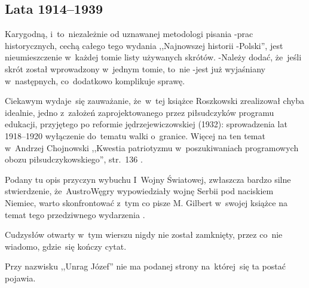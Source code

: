 \documentclass[a4paper,11pt]{article}
\begin{document}
\subsection{Lata 1914--1939}

\vspace{\spaceThree}






\start Karygodną, i~to~niezależnie od uznawanej metodologi pisania
-prac historycznych, cechą całego tego wydania ,,Najnowszej historii
-Polski'', jest nieumieszczenie w~każdej tomie listy używanych
skrótów. -Należy dodać, że~jeśli skrót został wprowadzony w~jednym
tomie, to~nie -jest już wyjaśniany w~następnych, co~dodatkowo
komplikuje sprawę.

\vspace{\spaceFour}


\start Ciekawym wydaje~się zauważanie, że~w~tej książce Roszkowski
zrealizował chyba idealnie, jedno z~założeń zaprojektowanego przez
piłsudczyków programu edukacji, przyjętego po reformie
jędrzejewiczowskiej (1932): sprowadzenia lat 1918--1920 wyłączenie
do~tematu walki o~granice. Więcej na ten temat \\
w~Andrzej Chojnowski ,,Kwestia patriotyzmu w~poszukiwaniach
programowych obozu piłsudczykowskiego'', str.~136
\cite{PatriotyzmPolakow06}.

\vspace{\spaceFour}


\start {} Podany tu opis przyczyn wybuchu I~Wojny Światowej,
zwłaszcza bardzo silne stwierdzenie, że~Austro\dywiz Węgry
wypowiedziały wojnę Serbii pod naciskiem Niemiec, warto skonfrontować
z~tym co pisze M. Gilbert w~swojej książce na temat tego przedziwnego
wydarzenia \cite{GilbertPierwszaWojnaSwiatowa03}.

\vspace{\spaceFour}


\start {} Cudzysłów otwarty w~tym wierszu nigdy nie został
zamknięty, przez co~nie wiadomo, gdzie~się kończy cytat.

\start {} Przy nazwisku ,,Unrag Józef'' nie ma podanej
strony na~której~się ta postać pojawia.
\end{document}
